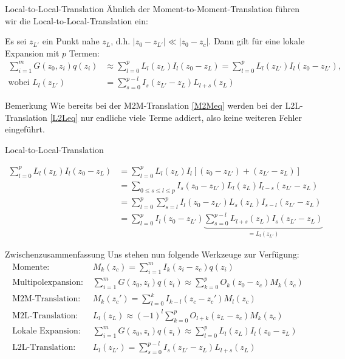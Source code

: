 \documentclass[ngerman]{beamer}
\begin{document}
\begin{frame}{Local-to-Local-Translation}
\normalsize
Ähnlich der Moment-to-Moment-Translation führen wir die Local-to-Local-Translation ein:
\begin{Satz}
Es sei $z_{L'}$ ein Punkt nahe $z_L$, d.h. $|z_0-z_{L'}|\ll |z_0-z_c|$. Dann gilt für eine lokale Expansion mit $p$ Termen:
\begin{align}
\sum_{i=1}^m {G(z_0,z_i)q(z_i)} &\approx \sum_{l=0}^p L_l(z_L)I_l(z_0-z_L) = \sum_{l=0}^p L_l(z_{L'})I_l(z_0-z_{L'}),\nonumber\\
\text{wobei } L_l(z_{L'})&=\sum_{s=0}^{p-l} I_s(z_{L'}-z_L)L_{l+s}(z_L)\label{L2Leq}
\end{align}
\end{Satz}
\begin{block}{Bemerkung}
Wie bereits bei der M2M-Translation \eqref{M2Meq} werden bei der L2L-Translation \eqref{L2Leq} nur endliche viele Terme addiert, also keine weiteren Fehler eingeführt.
\end{block}
\end{frame}

\begin{frame}{Local-to-Local-Translation}
\begin{Beweis}
\begin{align*}
\sum_{l=0}^p L_l(z_L)I_l(z_0-z_L) &= \sum_{l=0}^p L_l(z_L)I_l\left[(z_0-z_{L'}) + (z_{L'}-z_L)\right]\\
&=\sum_{0\leq s\leq l \leq p} I_s(z_0-z_{L'}) L_l(z_L)I_{l-s}(z_{L'}-z_L)\\
&=\sum_{l=0}^p \sum_{s=l}^p I_l(z_0-z_{L'}) L_s(z_L)I_{s-l}(z_{L'}-z_L) \\
&=\sum_{l=0}^p I_l(z_0-z_{L'}) \underbrace{\sum_{s=0}^{p-l}  L_{l+s}(z_L)I_{s}(z_{L'}-z_L)}_{=L_l(z_{L'})}
\end{align*}
\end{Beweis}
\end{frame}

\begin{frame}{Zwischenzusammenfassung}
Uns stehen nun folgende Werkzeuge zur Verfügung:
\small
\begin{align*}
\text{Momente: }& M_k(z_c) =  \sum_{i=1}^m I_k(z_i-z_c) q(z_i)\\
\text{Multipolexpansion: }&\sum_{i=1}^m {G(z_0,z_i)q(z_i)} \approx \sum_{k=0}^p O_k(z_0-z_c)M_k(z_c)\\
\text{M2M-Translation: }& M_k(z_c') = \sum_{l=0}^k I_{k-l}(z_c-z_c')M_l(z_c)\\
\text{M2L-Translation: }&L_l(z_L)\approx(-1)^l\sum_{k=0}^p O_{l+k}(z_L-z_c)M_k(z_c) \\
\text{Lokale Expansion: }&\sum_{i=1}^m {G(z_0,z_i)q(z_i)} \approx \sum_{l=0}^p L_l(z_L)I_l(z_0-z_L)\\
\text{L2L-Translation: }&L_l(z_{L'})=\sum_{s=0}^{p-l} I_s(z_{L'}-z_L)L_{l+s}(z_L)
\end{align*}
\end{frame}
\end{document}
